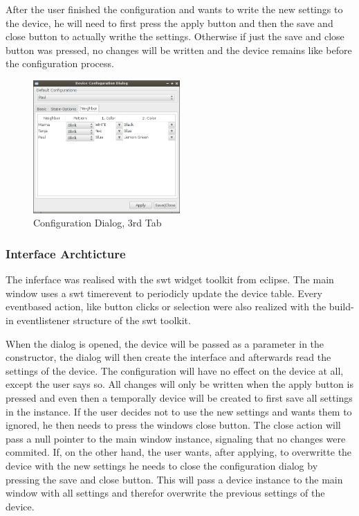 After the user finished the configuration and wants to write the new settings to the device, he will need to first press the apply button and then the save and close button to actually writhe the settings. Otherwise if just the save and close button was pressed, no changes will be written and the device remains like before the configuration process.
\begin{figure}[h!]
 \centering
 \includegraphics[width= 0.5\textwidth, clip=true  ,keepaspectratio=true]{./pic/java-server-config03.png}
 \caption{Configuration Dialog, 3rd Tab}
 \label{fig:java-server-config03}
\end{figure}

\subsubsection{Interface Archticture}
The inferface was realised with the swt widget toolkit from eclipse. %
The main window uses a swt timerevent to periodicly update the device table. Every eventbased action, like button clicks or selection were also realized with the build-in eventlistener structure of the swt toolkit. %

When the dialog is opened, the device will be passed as a parameter in the constructor, the dialog will then create the interface and afterwards read the settings of the device. 
The configuration will have no effect on the device at all, except the user says so. All changes will only be written when the apply button is pressed and even then a temporally device will be created to first save all settings in the instance. If the user decides not to use the new settings and wants them to ignored, he then needs to press the windows close button. The close action will pass a null pointer to the main window instance, signaling that no changes were commited.
If, on the other hand, the user wants, after applying, to overwritte the device with the new settings he needs to close the configuration dialog by pressing the save and close button. This will pass a device instance to the main window with all settings and therefor overwrite the previous settings of the device.

